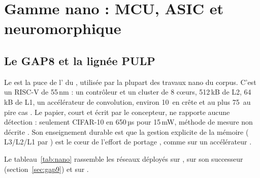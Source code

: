 \section{Gamme nano : MCU, ASIC et neuromorphique}
\label{sec:nano}

\subsection{Le GAP8 et la lignée PULP}

Le  \citep{2018-flamand-gap-8-risc-v-soc} est la puce de l' du ,
utilisée par la plupart des travaux nano du corpus. C'est un  RISC-V de 55\,nm : un
contrôleur et un cluster de 8 cœurs, 512\,kB de L2, 64\,kB de L1, un accélérateur de
convolution, environ 10\, en crête et au plus 75\, au pire cas . Le papier, court et écrit par le concepteur, ne rapporte aucune détection :
seulement CIFAR-10 en 650\,µs pour 15\,mW, méthode de mesure non décrite . Son
enseignement durable est que la gestion explicite de la mémoire ( L3/L2/L1 par
) est le cœur de l'effort de portage \deduit, comme sur un accélérateur  .

Le tableau~\ref{tab:nano} rassemble les réseaux déployés sur , sur son successeur 
(section~\ref{sec:gap9}) et sur .

